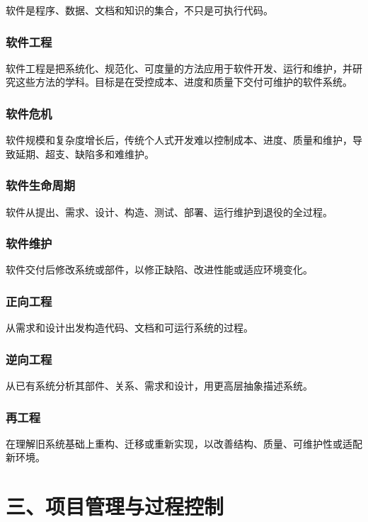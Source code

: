 \documentclass[UTF8,zihao=-4]{ctexart}
\begin{document}
软件是程序、数据、文档和知识的集合，不只是可执行代码。


\subsubsection*{软件工程}


软件工程是把系统化、规范化、可度量的方法应用于软件开发、运行和维护，并研究这些方法的学科。目标是在受控成本、进度和质量下交付可维护的软件系统。


\subsubsection*{软件危机}


软件规模和复杂度增长后，传统个人式开发难以控制成本、进度、质量和维护，导致延期、超支、缺陷多和难维护。


\subsubsection*{软件生命周期}


软件从提出、需求、设计、构造、测试、部署、运行维护到退役的全过程。


\subsubsection*{软件维护}


软件交付后修改系统或部件，以修正缺陷、改进性能或适应环境变化。


\subsubsection*{正向工程}


从需求和设计出发构造代码、文档和可运行系统的过程。


\subsubsection*{逆向工程}


从已有系统分析其部件、关系、需求和设计，用更高层抽象描述系统。


\subsubsection*{再工程}


在理解旧系统基础上重构、迁移或重新实现，以改善结构、质量、可维护性或适配新环境。


\section{三、项目管理与过程控制}
\end{document}
